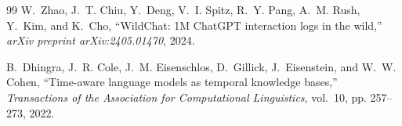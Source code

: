 \documentclass[conference]{IEEEtran}
\begin{document}
\begin{thebibliography}{99}
W.~Zhao, J.~T. Chiu, Y.~Deng, V.~I. Spitz, R.~Y. Pang, A.~M. Rush,
  Y.~Kim, and K.~Cho, ``{WildChat}: 1M {ChatGPT} interaction logs in the
  wild,'' \textit{arXiv preprint arXiv:2405.01470}, 2024.

B.~Dhingra, J.~R. Cole, J.~M. Eisenschlos, D.~Gillick, J.~Eisenstein, and
  W.~W. Cohen, ``Time-aware language models as temporal knowledge bases,''
  \textit{Transactions of the Association for Computational Linguistics},
  vol.~10, pp. 257--273, 2022.

\end{thebibliography}
\end{document}
